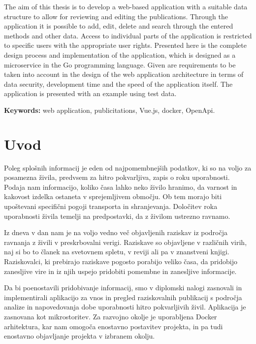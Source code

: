 \documentclass[a4paper, 12pt]{book}
\newcommand{\tkeywordsEn}{web application, publicitations, Vue.js, docker, OpenApi}
\newcommand{\clearemptydoublepage}{\newpage{\pagestyle{empty}\cleardoublepage}}
\begin{document}
The aim of this thesis is to develop a web-based application with a suitable data structure to allow for reviewing and editing the publications. Through the application it is possible to add, edit, delete and search through the entered methods and other data. Access to individual parts of the application is restricted to specific users with the appropriate user rights. Presented here is the complete design process and implementation of the application, which is designed as a microservice in the Go programming language. Given are requirements to be taken into account in the design of the web application architecture in terms of data security, development time and the speed of the application itself. The application is presented with an example using test data.
\bigskip

\noindent\textbf{Keywords:} \tkeywordsEn.
\clearemptydoublepage

\mainmatter
\setcounter{page}{1}
\pagestyle{fancy}


\chapter{Uvod}

Poleg splošnih informacij je eden od najpomembnejših podatkov, ki so na voljo za posamezna živila, predvsem za hitro pokvarljiva, zapis o roku uporabnosti. Podaja nam informacijo, koliko časa lahko neko živilo hranimo, da varnost in kakovost izdelka ostaneta v sprejemljivem območju. Ob tem morajo biti upoštevani specifični pogoji transporta in shranjevanja. Določitev roka uporabnosti živila temelji na predpostavki, da z živilom ustrezno ravnamo.

Iz dneva v dan nam je na voljo vedno več objavljenih raziskav iz področja ravnanja z živili v preskrbovalni verigi. Raziskave so objavljene v različnih virih, naj si bo to članek na svetovnem spletu, v reviji ali pa v znanstveni knjigi. Raziskovalci, ki prebirajo raziskave pogosto porabijo veliko časa, da pridobijo zanesljive vire in iz njih uspejo pridobiti pomembne in zanesljive informacije.

Da bi poenostavili pridobivanje informacij, smo v diplomski nalogi zasnovali in implementirali aplikacijo za vnos in pregled raziskovalnih publikacij s področja analize in napovedovanja dobe uporabnosti hitro pokvarljivih živil. Aplikacija je zasnovana kot mikrostoritev. Za razvojno okolje je uporabljena Docker arhitektura, kar nam omogoča enostavno postavitev projekta, in pa tudi enostavno objavljanje projekta v izbranem okolju. 
\end{document}

